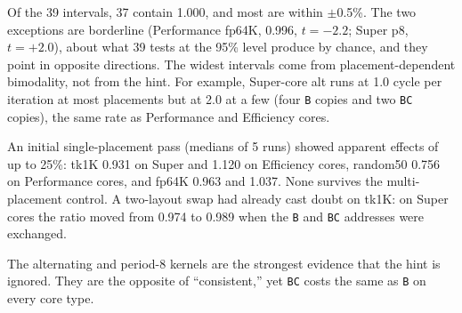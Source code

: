 \documentclass[10pt]{article}
\begin{document}
Of the 39 intervals, 37 contain 1.000, and most are within $\pm$0.5\%. The two exceptions are
borderline (Performance fp64K, 0.996, $t=-2.2$; Super p8, $t=+2.0$), about what 39 tests at
the 95\% level produce by chance, and they point in opposite directions. The widest intervals
come from placement-dependent bimodality, not from the hint. For example, Super-core alt runs
at 1.0 cycle per iteration at most placements but at 2.0 at a few (four \texttt{B} copies and
two \texttt{BC} copies), the same rate as Performance and Efficiency cores.

An initial single-placement pass (medians of 5 runs) showed apparent effects of up to 25\%:
tk1K 0.931 on Super and 1.120 on Efficiency cores, random50 0.756 on Performance cores, and
fp64K 0.963 and 1.037. None survives the multi-placement control. A two-layout swap had
already cast doubt on tk1K: on Super cores the ratio moved from 0.974 to 0.989 when the
\texttt{B} and \texttt{BC} addresses were exchanged.

The alternating and period-8 kernels are the strongest evidence that the hint is ignored.
They are the opposite of ``consistent,'' yet \texttt{BC} costs the same as \texttt{B} on
every core type.
\end{document}
